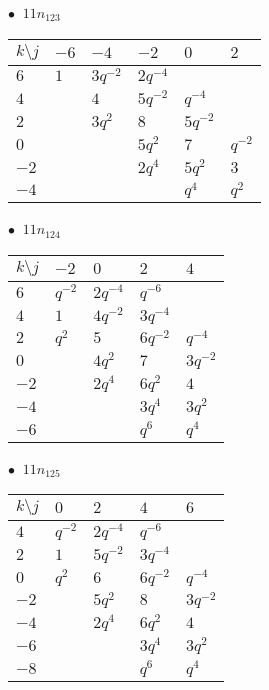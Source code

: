 %
\begin{minipage}{\linewidth}
$\bullet\ $ $11n_{123}$ \vspace{0.5em} \\
\begin{tabular}{l|lllll}
$k \setminus j$ & $-6$ & $-4$ & $-2$ & $0$ & $2$ \\
\hline
$6$ & $1$ & $3q^{-2}$ & $2q^{-4}$ &  &  \\
$4$ &  & $4$ & $5q^{-2}$ & $q^{-4}$ &  \\
$2$ &  & $3q^{2}$ & $8$ & $5q^{-2}$ &  \\
$0$ &  &  & $5q^{2}$ & $7$ & $q^{-2}$ \\
$-2$ &  &  & $2q^{4}$ & $5q^{2}$ & $3$ \\
$-4$ &  &  &  & $q^{4}$ & $q^{2}$ \\
\end{tabular}
\vspace{2em}
\end{minipage}
%
\begin{minipage}{\linewidth}
$\bullet\ $ $11n_{124}$ \vspace{0.5em} \\
\begin{tabular}{l|llll}
$k \setminus j$ & $-2$ & $0$ & $2$ & $4$ \\
\hline
$6$ & $q^{-2}$ & $2q^{-4}$ & $q^{-6}$ &  \\
$4$ & $1$ & $4q^{-2}$ & $3q^{-4}$ &  \\
$2$ & $q^{2}$ & $5$ & $6q^{-2}$ & $q^{-4}$ \\
$0$ &  & $4q^{2}$ & $7$ & $3q^{-2}$ \\
$-2$ &  & $2q^{4}$ & $6q^{2}$ & $4$ \\
$-4$ &  &  & $3q^{4}$ & $3q^{2}$ \\
$-6$ &  &  & $q^{6}$ & $q^{4}$ \\
\end{tabular}
\vspace{2em}
\end{minipage}
%
\begin{minipage}{\linewidth}
$\bullet\ $ $11n_{125}$ \vspace{0.5em} \\
\begin{tabular}{l|llll}
$k \setminus j$ & $0$ & $2$ & $4$ & $6$ \\
\hline
$4$ & $q^{-2}$ & $2q^{-4}$ & $q^{-6}$ &  \\
$2$ & $1$ & $5q^{-2}$ & $3q^{-4}$ &  \\
$0$ & $q^{2}$ & $6$ & $6q^{-2}$ & $q^{-4}$ \\
$-2$ &  & $5q^{2}$ & $8$ & $3q^{-2}$ \\
$-4$ &  & $2q^{4}$ & $6q^{2}$ & $4$ \\
$-6$ &  &  & $3q^{4}$ & $3q^{2}$ \\
$-8$ &  &  & $q^{6}$ & $q^{4}$ \\
\end{tabular}
\vspace{2em}
\end{minipage}
